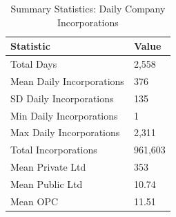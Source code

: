 \begin{table}[!h]
\centering
\caption{\label{tab:tab:company_summary}Summary Statistics: Daily Company Incorporations}
\centering
\begin{tabular}[t]{ll}
\toprule
Statistic & Value\\
\midrule
Total Days & 2,558\\
Mean Daily Incorporations & 376\\
SD Daily Incorporations & 135\\
Min Daily Incorporations & 1\\
Max Daily Incorporations & 2,311\\
\addlinespace
Total Incorporations & 961,603\\
Mean Private Ltd & 353\\
Mean Public Ltd & 10.74\\
Mean OPC & 11.51\\
\bottomrule
\end{tabular}
\end{table}
